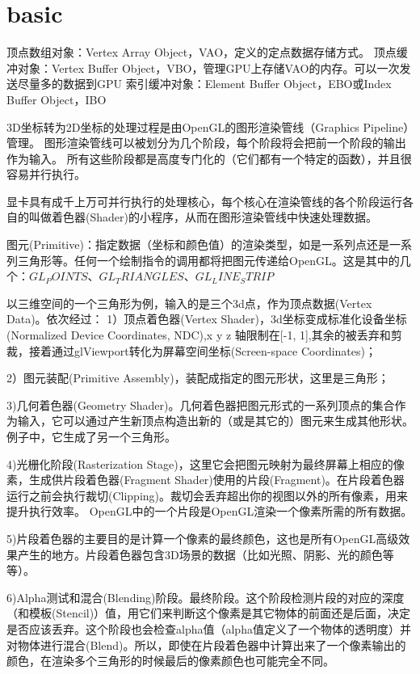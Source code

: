 \documentclass[UTF8]{article}
\begin{document}

\section{basic}

顶点数组对象：Vertex Array Object，VAO，定义的定点数据存储方式。
顶点缓冲对象：Vertex Buffer Object，VBO，管理GPU上存储VAO的内存。可以一次发送尽量多的数据到GPU
索引缓冲对象：Element Buffer Object，EBO或Index Buffer Object，IBO

3D坐标转为2D坐标的处理过程是由OpenGL的图形渲染管线（Graphics Pipeline）管理。
图形渲染管线可以被划分为几个阶段，每个阶段将会把前一个阶段的输出作为输入。
所有这些阶段都是高度专门化的（它们都有一个特定的函数），并且很容易并行执行。

显卡具有成千上万可并行执行的处理核心，每个核心在渲染管线的各个阶段运行各自的叫做着色器(Shader)的小程序，从而在图形渲染管线中快速处理数据。


图元(Primitive)：指定数据（坐标和颜色值）的渲染类型，如是一系列点还是一系列三角形等。任何一个绘制指令的调用都将把图元传递给OpenGL。这是其中的几个：$GL_POINTS、GL_TRIANGLES、GL_LINE_STRIP$

以三维空间的一个三角形为例，输入的是三个3d点，作为顶点数据(Vertex Data)。依次经过：
1）顶点着色器(Vertex Shader)，3d坐标变成标准化设备坐标(Normalized Device Coordinates, NDC),x y z 轴限制在[-1, 1],其余的被丢弃和剪裁，接着通过glViewport转化为屏幕空间坐标(Screen-space Coordinates)；

2）图元装配(Primitive Assembly)，装配成指定的图元形状，这里是三角形；

3)几何着色器(Geometry Shader)。几何着色器把图元形式的一系列顶点的集合作为输入，它可以通过产生新顶点构造出新的（或是其它的）图元来生成其他形状。例子中，它生成了另一个三角形。

4)光栅化阶段(Rasterization Stage)，这里它会把图元映射为最终屏幕上相应的像素，生成供片段着色器(Fragment Shader)使用的片段(Fragment)。在片段着色器运行之前会执行裁切(Clipping)。裁切会丢弃超出你的视图以外的所有像素，用来提升执行效率。
OpenGL中的一个片段是OpenGL渲染一个像素所需的所有数据。

5)片段着色器的主要目的是计算一个像素的最终颜色，这也是所有OpenGL高级效果产生的地方。片段着色器包含3D场景的数据（比如光照、阴影、光的颜色等等）。

6)Alpha测试和混合(Blending)阶段。最终阶段。这个阶段检测片段的对应的深度（和模板(Stencil)）值，用它们来判断这个像素是其它物体的前面还是后面，决定是否应该丢弃。这个阶段也会检查alpha值（alpha值定义了一个物体的透明度）并对物体进行混合(Blend)。所以，即使在片段着色器中计算出来了一个像素输出的颜色，在渲染多个三角形的时候最后的像素颜色也可能完全不同。
\end{document}
